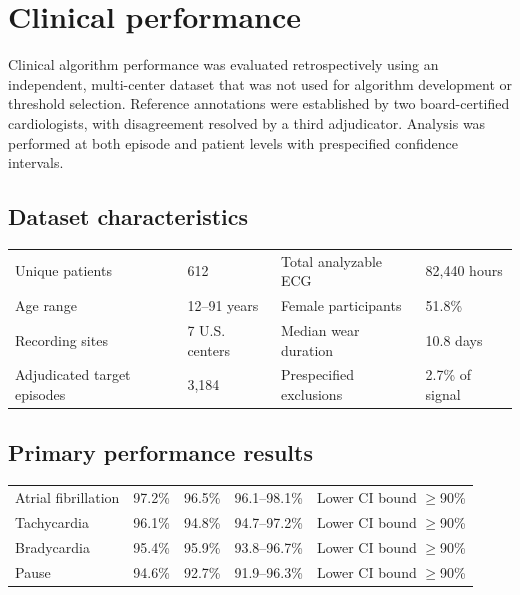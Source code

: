 \section{Clinical performance}

Clinical algorithm performance was evaluated retrospectively using an independent, multi-center dataset that was not used for algorithm development or threshold selection. Reference annotations were established by two board-certified cardiologists, with disagreement resolved by a third adjudicator. Analysis was performed at both episode and patient levels with prespecified confidence intervals.

\subsection{Dataset characteristics}
\begin{tabularx}{\textwidth}{@{}L{2.05in}Y L{2.05in}Y@{}}
\toprule
{} &  &  &  \\
\midrule
Unique patients & 612 & Total analyzable ECG & 82,440 hours \\
Age range & 12--91 years & Female participants & 51.8\% \\
Recording sites & 7 U.S. centers & Median wear duration & 10.8 days \\
Adjudicated target episodes & 3,184 & Prespecified exclusions & 2.7\% of signal \\
\bottomrule
\end{tabularx}

\subsection{Primary performance results}
\begin{tabularx}{\textwidth}{@{}L{1.60in}C{1.05in}C{1.05in}C{1.30in}Y@{}}
\toprule
{}
 &  &  &  &  \\
\midrule
Atrial fibrillation & 97.2\% & 96.5\% & 96.1--98.1\% & Lower CI bound $\geq$90\% \\
Tachycardia & 96.1\% & 94.8\% & 94.7--97.2\% & Lower CI bound $\geq$90\% \\
Bradycardia & 95.4\% & 95.9\% & 93.8--96.7\% & Lower CI bound $\geq$90\% \\
Pause & 94.6\% & 92.7\% & 91.9--96.3\% & Lower CI bound $\geq$90\% \\
\bottomrule
\end{tabularx}

